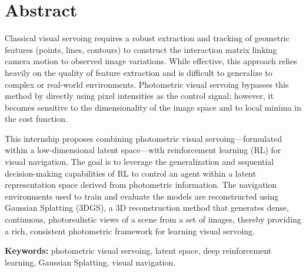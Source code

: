 \newpage
\section*{Abstract}

Classical visual servoing requires a robust extraction and tracking of geometric features (points, lines, contours) to construct the interaction matrix linking camera motion to observed image variations. While effective, this approach relies heavily on the quality of feature extraction and is difficult to generalize to complex or real-world environments. Photometric visual servoing bypasses this method  by directly using pixel intensities as the control signal; however, it becomes sensitive to the dimensionality of the image space and to local minima in the cost function.


This internship proposes combining photometric visual servoing—formulated within a low-dimensional latent space—with reinforcement learning (RL) for visual navigation. The goal is to leverage the generalization and sequential decision-making capabilities of RL to control an agent within a latent representation space derived from photometric information. The navigation environments used to train and evaluate the models are reconstructed using Gaussian Splatting (3DGS), a 3D reconstruction method that generates dense, continuous, photorealistic views of a scene from a set of images, thereby providing a rich, consistent photometric framework for learning visual servoing.

\vspace{0.5cm}
\textbf{Keywords:} photometric visual servoing, latent space, deep reinforcement learning, Gaussian Splatting, visual navigation.